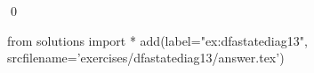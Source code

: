 
\begin{ex} 
  \label{ex:dfastatediag13}
  
  \qed
\end{ex} 
\begin{python0}
from solutions import *
add(label="ex:dfastatediag13",
    srcfilename='exercises/dfastatediag13/answer.tex') 
\end{python0}
